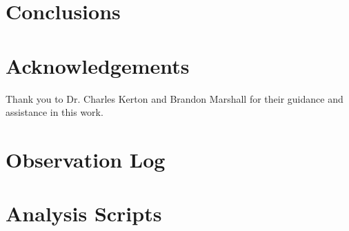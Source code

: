 \documentclass[%
aip,
jmp,
reprint,
]{revtex4-1}
\begin{document}
	\section{Conclusions}
	
	
	
	\section*{Acknowledgements}
	
	Thank you to Dr. Charles Kerton and Brandon Marshall for their guidance and assistance in this work.
	
	
	
	
	\onecolumngrid
	\appendix
	\section{Observation Log}
	
	\begin{table}[h!]
		\centering
		\label{table:log}
		
	\end{table}
	
	\section{Analysis Scripts}
	
	
\end{document}
